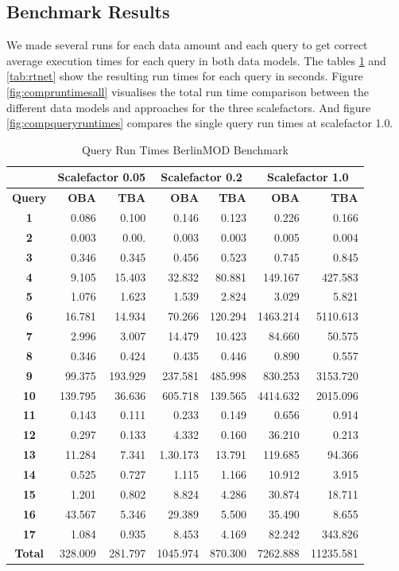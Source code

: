 \documentclass[a4paper]{article}
\newcommand{\bmodb} {BerlinMOD Benchmark}
\begin{document}
\subsection{Benchmark Results}
\label{sec:results}
We made several runs for each data amount and each query to get correct average execution times for each query in both data models. The tables \ref{tab:rtbmodb} and \ref{tab:rtnet} show the resulting run times for each query in seconds. Figure \ref{fig:compruntimesall} visualises the total run time comparison between the different data models and approaches for the three scalefactors. And figure \ref{fig:compqueryruntimes} compares the single query run times at scalefactor 1.0.
\begin{table}
\begin{scriptsize}
\begin{center}
\begin{tabular}{|c|r|r|r|r|r|r|}
\hline
&\multicolumn{2}{c|}{\textbf{Scalefactor 0.05}}&\multicolumn{2}{c|}{\textbf{Scalefactor 0.2}}&\multicolumn{2}{c|}{\textbf{Scalefactor 1.0}}\\
\hline
\textbf{Query}&\textbf{OBA}&\textbf{TBA}&\textbf{OBA}&\textbf{TBA}&\textbf{OBA}&\textbf{TBA}\\
\hline
\textbf{1}&0.086&0.100&0.146&0.123&0.226&0.166\\
\hline
\textbf{2}&0.003&0.00.&0.003&0.003&0.005&0.004\\
\hline
\textbf{3}&0.346&0.345&0.456&0.523&0.745&0.845\\
\hline
\textbf{4}&9.105&15.403&32.832&80.881&149.167&427.583\\
\hline
\textbf{5}&1.076&1.623&1.539&2.824&3.029&5.821\\
\hline
\textbf{6}&16.781&14.934&70.266&120.294&1463.214&5110.613\\
\hline
\textbf{7}&2.996&3.007&14.479&10.423&84.660&50.575\\
\hline
\textbf{8}&0.346&0.424&0.435&0.446&0.890&0.557\\
\hline
\textbf{9}&99.375&193.929&237.581&485.998&830.253&3153.720\\
\hline
\textbf{10}&139.795&36.636&605.718&139.565&4414.632&2015.096\\
\hline
\textbf{11}&0.143&0.111&0.233&0.149&0.656&0.914\\
\hline
\textbf{12}&0.297&0.133&4.332&0.160&36.210&0.213\\
\hline
\textbf{13}&11.284&7.341&1.30.173&13.791&119.685&94.366\\
\hline
\textbf{14}&0.525&0.727&1.115&1.166&10.912&3.915\\
\hline
\textbf{15}&1.201&0.802&8.824&4.286&30.874&18.711\\
\hline
\textbf{16}&43.567&5.346&29.389&5.500&35.490&8.655\\
\hline
\textbf{17}&1.084&0.935&8.453&4.169&82.242&343.826\\
\hline
\textbf{Total}&328.009&281.797&1045.974&870.300&7262.888&11235.581\\
\hline
\end{tabular}
\end{center}
\end{scriptsize}
\caption{Query Run Times \bmodb{}}
\label{tab:rtbmodb}
\end{table}
\end{document}
